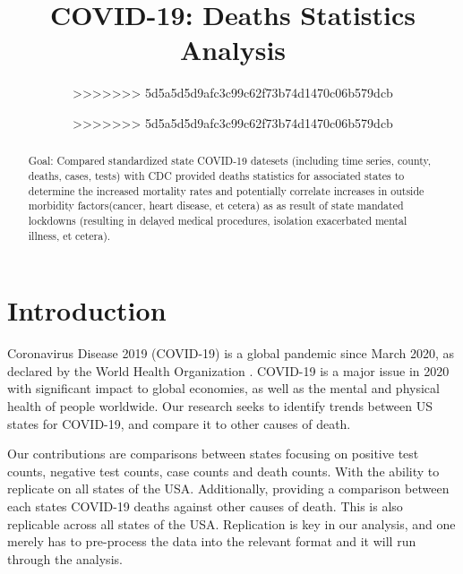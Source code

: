 \documentclass[conference]{IEEEtran}
\begin{document}
\title{COVID-19: Deaths Statistics Analysis}
\author{
>>>>>>> 5d5a5d5d9afc3c99c62f73b74d1470c06b579dcb
\and
{}
>>>>>>> 5d5a5d5d9afc3c99c62f73b74d1470c06b579dcb
\and
{}
}
\maketitle

\begin{abstract}
Goal: Compared standardized state COVID-19 datesets (including time series, county, deaths, cases, tests) with CDC provided deaths statistics for associated states to determine the increased mortality rates and potentially correlate increases in outside morbidity factors(cancer, heart disease, et cetera) as as result of state mandated lockdowns (resulting in delayed medical procedures, isolation exacerbated mental illness, et cetera).
\end{abstract}

\section{Introduction}

Coronavirus Disease 2019 (COVID-19) is a global pandemic since March 2020, as declared by the World Health Organization \cite{cucinotta_who_2020}.
COVID-19 is a major issue in 2020 with significant impact to global economies, as well as the mental and physical health of people worldwide.
Our research seeks to identify trends between US states for COVID-19, and compare it to other causes of death.

Our contributions are comparisons between states focusing on positive test counts, negative test counts, case counts and death counts. 
With the ability to replicate on all states of the USA. 
Additionally, providing a comparison between each states COVID-19 deaths against other causes of death.
This is also replicable across all states of the USA.
Replication is key in our analysis, and one merely has to pre-process the data into the relevant format and it will run through the analysis.
\end{document}
